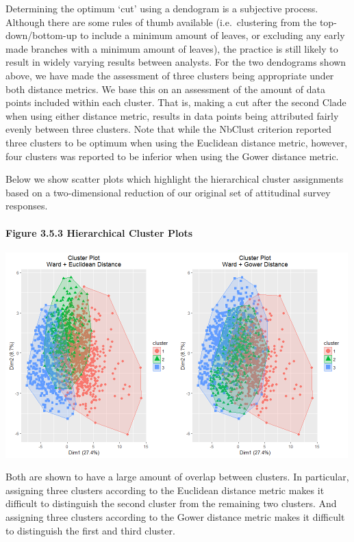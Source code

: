 \documentclass[]{article}
\let\oldparagraph\paragraph
\renewcommand{\paragraph}[1]{\oldparagraph{#1}\mbox{}}
\begin{document}
Determining the optimum `cut' using a dendogram is a subjective process.
Although there are some rules of thumb available (i.e.~clustering from
the top-down/bottom-up to include a minimum amount of leaves, or
excluding any early made branches with a minimum amount of leaves), the
practice is still likely to result in widely varying results between
analysts. For the two dendograms shown above, we have made the
assessment of three clusters being appropriate under both distance
metrics. We base this on an assessment of the amount of data points
included within each cluster. That is, making a cut after the second
Clade when using either distance metric, results in data points being
attributed fairly evenly between three clusters. Note that while the
NbClust criterion reported three clusters to be optimum when using the
Euclidean distance metric, however, four clusters was reported to be
inferior when using the Gower distance metric.

Below we show scatter plots which highlight the hierarchical cluster
assignments based on a two-dimensional reduction of our original set of
attitudinal survey responses.

\paragraph{Figure 3.5.3 Hierarchical Cluster
Plots}\label{figure-3.5.3-hierarchical-cluster-plots}

\includegraphics[width=5.20833in]{images/hier_clust.png}

Both are shown to have a large amount of overlap between clusters. In
particular, assigning three clusters according to the Euclidean distance
metric makes it difficult to distinguish the second cluster from the
remaining two clusters. And assigning three clusters according to the
Gower distance metric makes it difficult to distinguish the first and
third cluster.
\end{document}

